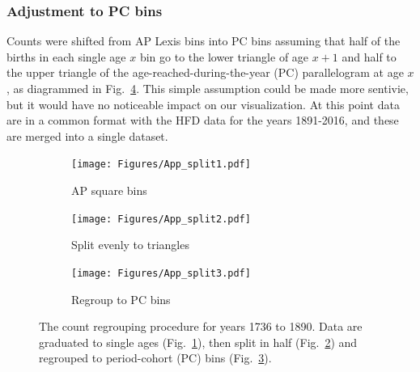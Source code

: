 \subsubsection{Adjustment to PC bins}
\label{sec:split}
Counts were shifted from AP Lexis bins into PC bins assuming that half of the births in each single age $x$ bin go to the lower triangle of age $x+1$ and half to the upper triangle of the age-reached-during-the-year (PC) parallelogram at age $x$, as diagrammed in Fig.~\ref{fig:AP2PC}. This simple assumption could be made more sentivie, but it would have no noticeable impact on our visualization. At this point data are in a common format with the HFD data for the years 1891-2016, and these are merged into a single dataset.

\begin{figure}[ht!]
\centering
\begin{subfigure}{.3\textwidth}
\centering
\texttt{[image: Figures/App\_split1.pdf]}
\caption{AP square bins}
\label{fig:app1}
\end{subfigure}%
		\begin{subfigure}{.3\textwidth}
\centering
\texttt{[image: Figures/App\_split2.pdf]}
\caption{Split evenly to triangles}
\label{fig:app2}
\end{subfigure}
\begin{subfigure}{.3\textwidth}
\centering
\texttt{[image: Figures/App\_split3.pdf]}
\caption{Regroup to PC bins}
\label{fig:app3}
\end{subfigure}
\caption{The count regrouping procedure for years 1736 to 1890. Data are graduated to single ages (Fig.~\ref{fig:app1}), then split in half (Fig.~\ref{fig:app2}) and regrouped to period-cohort (PC) bins (Fig.~\ref{fig:app3}).}
\label{fig:AP2PC}
\end{figure}

\FloatBarrier
